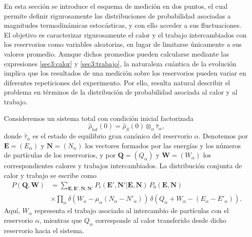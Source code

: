 En esta sección se introduce el esquema de medición en dos puntos, el cual permite definir rigurosamente las distribuciones de probabilidad asociadas a magnitudes termodinámicas estocásticas, y con ello acceder a sus fluctuaciones\cite{esposito2009nonequilibrium}. El objetivo es caracterizar rigurosamente el calor y el trabajo intercambiados con los reservorios como variables aleatorias, en lugar de limitarse únicamente a sus valores promedio. Aunque dichos promedios pueden calcularse mediante las expresiones \eqref{sec3:calor} y \eqref{sec3:trabajo}, la naturaleza cuántica de la evolución implica que los resultados de una medición sobre los reservorios pueden variar en diferentes repeticiones del experimento. Por ello, resulta natural describir el problema en términos de la distribución de probabilidad asociada al calor y al trabajo.

Consideremos un sistema total con condición inicial factorizada
\[
\hat{\rho}_{tot}(0) = \hat{\rho}_{S}(0)\otimes_{\alpha}\hat{\tau}_{\alpha},
\]
donde $\hat{\tau}_{\alpha}$ es el estado de equilibrio gran canónico del reservorio $\alpha$. Denotemos por $\mathbf{E}=(E_{\alpha})$ y $\mathbf{N}=(N_{\alpha})$ los vectores formados por las energías y los números de partículas de los reservorios, y por $\mathbf{Q}=(Q_{\alpha})$ y $\mathbf{W}=(W_{\alpha})$ los correspondientes calores y trabajos intercambiados. La distribución conjunta de calor y trabajo se escribe como
\begin{align*}
    P(\mathbf{Q},\mathbf{W}) & = \sum_{\mathbf{E},\mathbf{E}',\mathbf{N},\mathbf{N}'} 
    P_{t}(\mathbf{E}',\mathbf{N}'|\mathbf{E},\mathbf{N})\, P_{0}(\mathbf{E},\mathbf{N}) \\
    & \times \prod_{\alpha} \delta\!\left(W_{\alpha}-\mu_{\alpha}(N_{\alpha}-N'_{\alpha})\right)\,
    \delta\!\left(Q_{\alpha}+W_{\alpha}-(E_{\alpha}-E'_{\alpha})\right).
\end{align*}
Aquí, $W_\alpha$ representa el trabajo asociado al intercambio de partículas con el reservorio $\alpha$, mientras que $Q_\alpha$ corresponde al calor transferido desde dicho reservorio hacia el sistema.
\\

